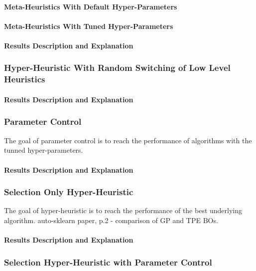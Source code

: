 \paragraph{Meta-Heuristics With Default Hyper-Parameters}

\paragraph{Meta-Heuristics With Tuned Hyper-Parameters}

\paragraph{Results Description and Explanation}


\subsubsection{Hyper-Heuristic With Random Switching of Low Level Heuristics}

\paragraph{Results Description and Explanation}


\subsubsection{Parameter Control}
The goal of parameter control is to reach the performance of algorithms with the tunned hyper-parameters.
\paragraph{Results Description and Explanation}


\subsubsection{Selection Only Hyper-Heuristic}
The goal of hyper-heuristic is to reach the performance of the best underlying algorithm.
auto-sklearn paper, p.2 - comparison of GP and TPE BOs.

\paragraph{Results Description and Explanation}


\subsubsection{Selection Hyper-Heuristic with Parameter Control}

